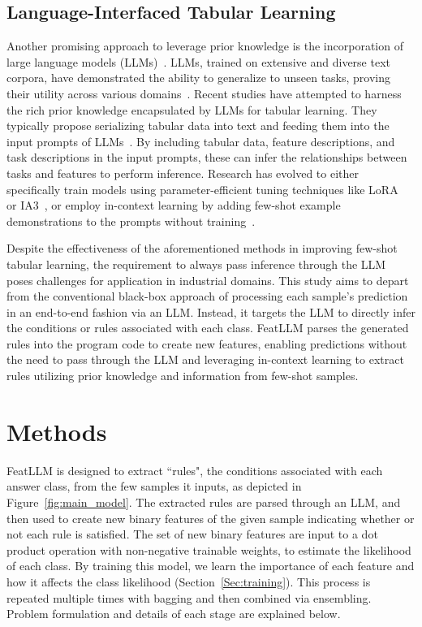 \subsection{Language-Interfaced Tabular Learning} Another promising approach to leverage prior knowledge is the incorporation of large language models (LLMs)~\cite{anil2023palm,openai2023gpt4}. LLMs, trained on extensive and diverse text corpora, have demonstrated the ability to generalize to unseen tasks, proving their utility across various domains~\cite{brown2020language}. Recent studies have attempted to harness the rich prior knowledge encapsulated by LLMs for tabular learning. They typically propose serializing tabular data into text and feeding them into the input prompts of LLMs~\cite{dinh2022lift,hegselmann2023tabllm,wang2023anypredict}. By including tabular data, feature descriptions, and task descriptions in the input prompts, these can infer the relationships between tasks and features to perform inference. Research has evolved to either specifically train models using parameter-efficient tuning techniques like LoRA~\cite{hu2021lora} or IA3~\cite{liu2022few}, or employ in-context learning by adding few-shot example demonstrations to the prompts without training~\cite{dinh2022lift,hegselmann2023tabllm,nam2023semi,slack2023tablet}.

Despite the effectiveness of the aforementioned methods in improving few-shot tabular learning, the requirement to always pass inference through the LLM poses challenges for application in industrial domains. This study aims to depart from the conventional black-box approach of processing each sample's prediction in an end-to-end fashion via an LLM. Instead, it targets the LLM to directly infer the conditions or rules associated with each class. \textsf{FeatLLM} parses the generated rules into the program code to create new features, enabling predictions without the need to pass through the LLM and leveraging in-context learning to extract rules utilizing prior knowledge and information from few-shot samples. 

\section{Methods}
\textsf{FeatLLM} is designed to extract ``rules", the conditions associated with each answer class, from the few samples it inputs, as depicted in Figure~\ref{fig:main_model}. The extracted rules are parsed through an LLM, and then used to create new binary features of the given sample indicating whether or not each rule is satisfied. The set of new binary features are input to a dot product operation with non-negative trainable weights, to estimate the likelihood of each class. By training this model, we learn the importance of each feature and how it affects the class likelihood (Section~\ref{Sec:training}). This process is repeated multiple times with bagging and then combined via ensembling. Problem formulation and details of each stage are explained below. 

